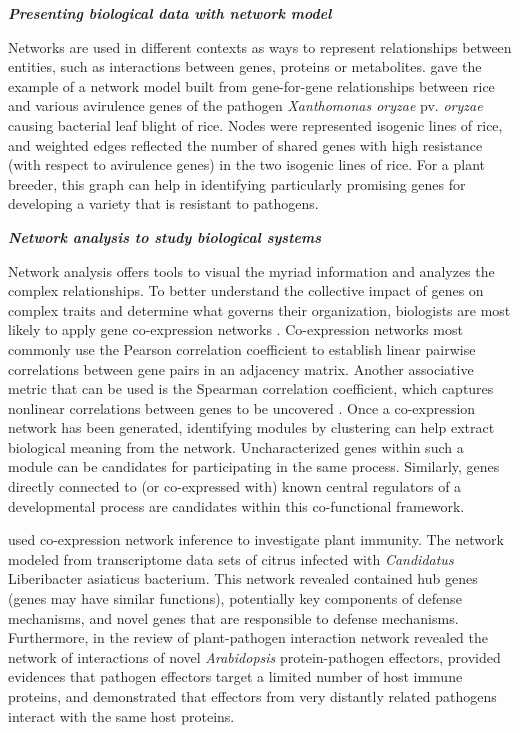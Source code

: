 \textit{\textbf{Presenting biological data with network model}}

Networks are used in different contexts as ways to represent relationships between entities, such as interactions between genes, proteins or metabolites.  gave the example of a network model built from gene-for-gene relationships between rice and various avirulence genes of the pathogen \textit{Xanthomonas oryzae} pv. \textit {oryzae} causing bacterial leaf blight of rice. Nodes were represented isogenic lines of rice, and weighted edges reflected the number of shared genes with high resistance (with respect to avirulence genes) in the two isogenic lines of rice. For a plant breeder, this graph can help in identifying particularly promising genes for developing a variety that is resistant to pathogens. 

\textit{\textbf{Network analysis to study biological systems}}

Network analysis offers tools to visual the myriad information and analyzes the complex relationships. To better understand the collective impact of genes on complex traits and determine what governs their organization, biologists are most likely to apply gene co-expression networks . Co-expression networks most commonly use the Pearson correlation coefficient to establish linear pairwise correlations between gene pairs in an adjacency matrix. Another associative metric that can be used is the Spearman correlation coefficient, which captures nonlinear correlations between genes to be uncovered . Once a co-expression network has been generated, identifying modules by clustering can help extract biological meaning from the network. Uncharacterized genes within such a module can be candidates for participating in the same process. Similarly, genes directly connected to (or co-expressed with) known central regulators of a developmental process are candidates within this co-functional framework.

 used co-expression network inference to investigate plant immunity. The network modeled from transcriptome data sets of citrus infected with \textit{Candidatus} Liberibacter asiaticus bacterium. This network revealed contained hub genes (genes may have similar functions), potentially key components of defense mechanisms, and novel genes that are responsible to defense mechanisms. Furthermore, in the review of  plant-pathogen interaction network revealed the network of interactions of novel \textit{Arabidopsis} protein-pathogen effectors, provided evidences that pathogen effectors target a limited number of host immune proteins, and demonstrated that effectors from very distantly related pathogens interact with the same host proteins. 

